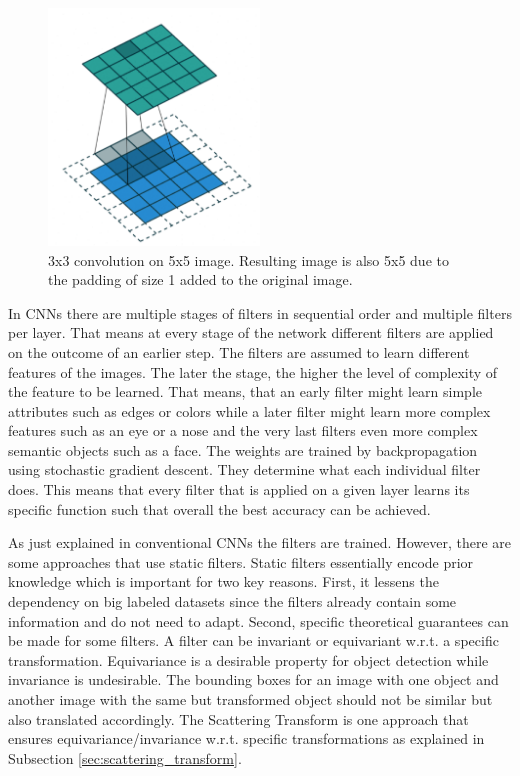 \begin{figure}[!htb]
    	\centering
    	\includegraphics[width=0.5\textwidth]{images/convolution.png}
    	\caption{3x3 convolution on 5x5 image. Resulting image is also 5x5 due to the padding of size 1 added to the original image. \protect\footnotemark}
    	\label{fig:convolution}
 \end{figure}
 
 
 In CNNs there are multiple stages of filters in sequential order and multiple filters per layer. That means at every stage of the network different filters are applied on the outcome of an earlier step. The filters are assumed to learn different features of the images. The later the stage, the higher the level of complexity of the feature to be learned. That means, that an early filter might learn simple attributes such as edges or colors while a later filter might learn more complex features such as an eye or a nose and the very last filters even more complex semantic objects such as a face. The weights are trained by backpropagation using stochastic gradient descent. They determine what each individual filter does. This means that every filter that is applied on a given layer learns its specific function such that overall the best accuracy can be achieved. 
 
 As just explained in conventional CNNs the filters are trained. However, there are some approaches that use static filters. Static filters essentially encode prior knowledge which is important for two key reasons. First, it lessens the dependency on big labeled datasets since the filters already contain some information and do not need to adapt. Second, specific theoretical guarantees can be made for some filters. A filter can be invariant or equivariant w.r.t. a specific transformation. Equivariance is a desirable property for object detection while invariance is undesirable. The bounding boxes for an image with one object and another image with the same but transformed object should not be similar but also translated accordingly.
 The Scattering Transform is one approach that ensures equivariance/invariance w.r.t. specific transformations as explained in Subsection \ref{sec:scattering_transform}. 

